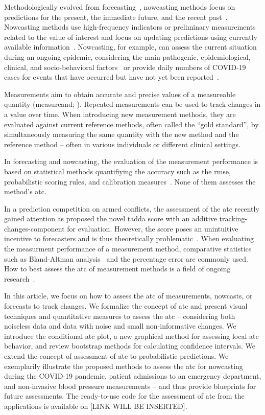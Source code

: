 \documentclass[pdflatex]{sn-jnl}
\theoremstyle{plain}%
\theoremstyle{definition}
\begin{document}
Methodologically evolved from forecasting~\citep{Browning1989}, nowcasting methods focus on predictions for the present, the immediate future, and the recent past~\citep{Banbura2013, WorldMeteorologicalOrganizationWMO2017}.
Nowcasting methods use high-frequency indicators or preliminary measurements related to the value of interest and focus on updating predictions using currently available information~\citep{Castle2017}.
Nowcasting, for example, can assess the current situation during an ongoing epidemic, considering the main pathogenic, epidemiological, clinical, and socio-behavioral factors~\citep{Wu2021} or provide daily numbers of COVID-19 cases for events that have occurred but have not yet been reported~\citep{Gunther2021, Wolffram2023}.

Measurements aim to obtain accurate and precise values of a measureable quantity (measureand; \citealp{Squara2021,Squara2021a}).
Repeated measurements can be used to track changes in a value over time.
When introducing new measurement methods, they are evaluated against current reference methods, often called the \enquote{gold standard}, by simultaneously measuring the same quantity with the new method and the reference method – often in various individuals or different clinical settings.

In forecasting and nowcasting, the evaluation of the measurement performance is based on statistical methods quantifiying the accuracy such as the \ac{rmse}, probabilistic scoring rules, and calibration measures~\citep{Gneiting2007, Gunther2021, Wolffram2023}.
None of them assesses the method's \ac{atc}.

In a prediction competition on armed conflicts, the assessment of the \ac{atc} recently gained attention as \citet{Vesco2022} proposed the novel \ac{tadda} score with an additive tracking-changes-component for evaluation.
However, the score poses an unintuitive incentive to forecasters and is thus theoretically problematic~\parencite{Bracher2023}.
When evaluating the measurment performance of a measurement method, comparative statistics such as Bland-Altman analysis~\citep{Bland1986} and the percentage error \parencite{Critchley1999} are commonly used.
How to best assess the \ac{atc} of measurement methods is a field of ongoing research~\citep{Saugel2015, Saugel2018, Hiraishi2021}.

In this article, we focus on how to assess the \ac{atc} of measurements, nowcasts, or forecasts to track changes. We formalize the concept of \ac{atc} and present visual techniques and quantitative measures to assess the \ac{atc} – considering both noiseless data and data with noise and small non-informative changes.
We introduce the conditional \ac{atc} plot, a new graphical method for assessing local \ac{atc} behavior, and review bootstrap methods for calculating confidence intervals.
We extend the concept of assessment of \ac{atc} to probabilistic predictions.
We exemplarily illustrate the proposed methods to assess the \ac{atc} for nowcasting during the COVID-19 pandemic, patient admissions to an emergency department, and non-invasive blood pressure measurements – and thus provide blueprints for future assessments.
The ready-to-use code for the assessment of \ac{atc} from the applications is available on [LINK WILL BE INSERTED].
\end{document}
